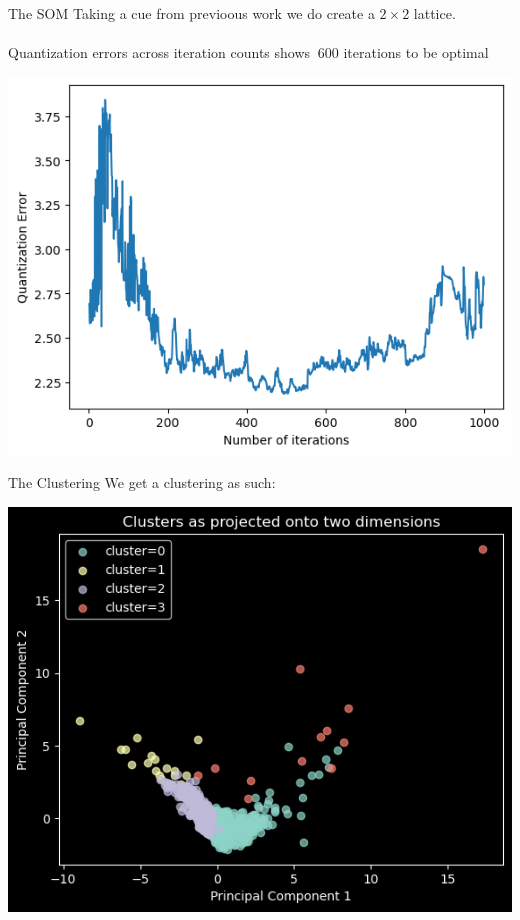 \documentclass{beamer}
\begin{document}
\begin{frame}{The SOM}
	Taking a cue from previoous work we do create a $2 \times 2$ lattice. \\~\\
	Quantization errors across iteration counts shows $~600$ iterations to be optimal
	\begin{center}
		\includegraphics[scale=0.45]{quantization-error-w.png}
	\end{center}
\end{frame}
\begin{frame}{The Clustering}
	We get a clustering as such:
	\begin{center}
	\includegraphics[scale=0.55]{cluster-pca.png}
	\end{center}
\end{frame}
\end{document}
